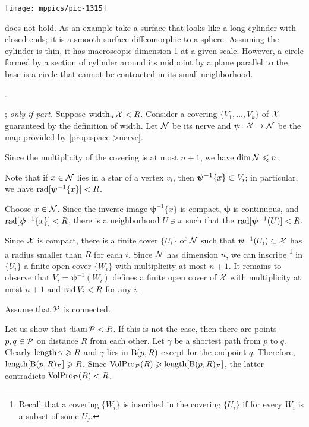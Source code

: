 \begin{Figure}
\vskip0mm
\centering
\texttt{[image: mppics/pic-1315]}
\end{Figure}

 does not hold.
As an example take a surface that looks like a long cylinder with closed ends;
it is a smooth surface diffeomorphic to a sphere.
Assuming the cylinder is thin, it has macroscopic dimension 1 at a given scale.
However, a circle formed by a section of cylinder around its midpoint by a plane parallel to the base is a circle that cannot be contracted in its small neighborhood.

 \cite[Appendix $1(\text{E}_{2})$]{gromov-1983}.

\parbf{\ref{ex:width=suprad(inv)}}; \textit{only-if part.}
Suppose $\operatorname{\rm width}\nolimits_n\mathcal{X}<R$.
Consider a covering $\{V_1,\dots,V_k\}$ of $\mathcal{X}$ guaranteed by the definition of width.
Let $\mathcal{N}$ be its nerve and $\bm{\psi}\colon\mathcal{X}\to \mathcal{N}$ be the map provided by \ref{prop:space->nerve}.

Since the multiplicity of the covering is at most $n+1$, we have $\operatorname{\rm dim}\nolimits \mathcal{N}\leqslant n$.

Note that if $x\in \mathcal{N}$ lies in a star of a vertex $v_i$,
then $\bm{\psi}^{-1}\{x\}\z\subset V_i$;
in particular, we have $\mathop{\rm rad}\nolimits[\bm{\psi}^{-1}\{x\}]<R$.

Choose $x\in \mathcal{N}$.
Since the inverse image $\bm{\psi}^{-1}\{x\}$ is compact, $\bm{\psi}$ is continuous, and $\mathop{\rm rad}\nolimits[\bm{\psi}^{-1}\{x\}]<R$,
there is a neighborhood $U\ni x$ such that the  $\mathop{\rm rad}\nolimits[\bm{\psi}^{-1}(U)]<R$.

Since $\mathcal{X}$ is compact,  there is a finite cover $\{U_i\}$ of $\mathcal{N}$ such that $\bm{\psi}^{-1}(U_i)\subset\mathcal{X}$ has a radius smaller than $R$ for each $i$.
Since $\mathcal{N}$ has dimension $n$, we can inscribe%
\footnote{Recall that a covering $\{W_i\}$ is inscribed in the covering $\{U_i\}$ if for every $W_i$ is a subset of some $U_j$.} 
in $\{U_i\}$ a finite open cover $\{W_i\}$ with multiplicity at most $n+1$.
It remains to observe that $V_i=\bm{\psi}^{-1}(W_i)$ defines a finite open cover of $\mathcal{X}$ with  multiplicity at most $n+1$ and $\mathop{\rm rad}\nolimits V_i<R$ for any $i$. 

Assume that $\mathcal{P}$ is connected.

Let us show that $\operatorname{\rm diam}\nolimits\mathcal{P}<R$.
If this is not the case, then there are points $p,q\in\mathcal{P}$ on distance $R$ from each other.
Let $\gamma$ be a shortest path from $p$ to $q$.
Clearly $\mathop{\rm length}\nolimits\gamma\geqslant R$ and $\gamma$ lies in $\mathrm{B}{}(p,R)$ except for the endpoint $q$.
Therefore, $\mathop{\rm length}\nolimits[\mathrm{B}{}(p,R)_{\mathcal{P}}]\geqslant R$.
Since $\VolPro_{\spc{P}}(R)\z\ge \length[\oBall(p,R)_{\spc{P}}]$,
the latter contradicts $\operatorname{\rm VolPro}\nolimits_{\mathcal{P}}(R)<R$.

